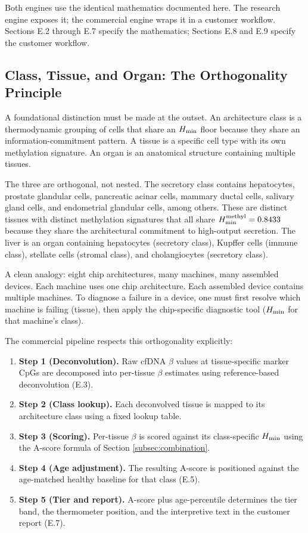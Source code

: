 \documentclass[12pt,a4paper]{article}
\begin{document}
Both engines use the identical mathematics documented here.
The research engine exposes it; the commercial engine wraps it in a
customer workflow. Sections E.2 through E.7 specify the mathematics;
Sections E.8 and E.9 specify the customer workflow.

\subsection{Class, Tissue, and Organ: The Orthogonality Principle}
\label{subsec:class_tissue_organ}

A foundational distinction must be made at the outset. An architecture
class is a thermodynamic grouping of cells that share an $H_{\rm min}$
floor because they share an information-commitment pattern. A tissue
is a specific cell type with its own methylation signature. An organ
is an anatomical structure containing multiple tissues.

The three are orthogonal, not nested. The secretory class contains
hepatocytes, prostate glandular cells, pancreatic acinar cells,
mammary ductal cells, salivary gland cells, and endometrial glandular
cells, among others. These are distinct tissues with distinct
methylation signatures that all share $H_{\rm min}^{\rm methyl} =
0.8433$ because they share the architectural commitment to
high-output secretion. The liver is an organ containing hepatocytes
(secretory class), Kupffer cells (immune class), stellate cells
(stromal class), and cholangiocytes (secretory class).

A clean analogy: eight chip architectures, many machines, many
assembled devices. Each machine uses one chip architecture. Each
assembled device contains multiple machines. To diagnose a failure
in a device, one must first resolve which machine is failing (tissue),
then apply the chip-specific diagnostic tool ($H_{\rm min}$ for that
machine's class).

The commercial pipeline respects this orthogonality explicitly:

\begin{enumerate}
\item \textbf{Step 1 (Deconvolution).} Raw cfDNA $\beta$ values at
tissue-specific marker CpGs are decomposed into per-tissue $\beta$
estimates using reference-based deconvolution (E.3).
\item \textbf{Step 2 (Class lookup).} Each deconvolved tissue is
mapped to its architecture class using a fixed lookup table.
\item \textbf{Step 3 (Scoring).} Per-tissue $\beta$ is scored against
its class-specific $H_{\rm min}$ using the A-score formula of
Section \ref{subsec:combination}.
\item \textbf{Step 4 (Age adjustment).} The resulting A-score is
positioned against the age-matched healthy baseline for that class
(E.5).
\item \textbf{Step 5 (Tier and report).} A-score plus age-percentile
determines the tier band, the thermometer position, and the
interpretive text in the customer report (E.7).
\end{enumerate}
\end{document}
